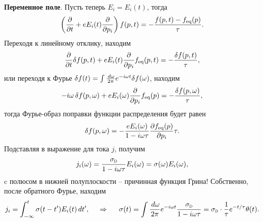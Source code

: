 \textbf{Переменное поле}. Пусть теперь $E_i = E_i (t)$, тогда
\begin{equation*}
	\left(
		\frac{\partial }{\partial t} + e E_i (t) \frac{\partial }{\partial p_i} 
	\right) f(p, t) = - \frac{f(p, t) - f_{\textnormal{eq}} (p)}{\tau}.
\end{equation*}
Переходя к линейному отклику, находим
\begin{equation*}
		\frac{\partial }{\partial t} \delta f(p, t) + e E_i (t) \frac{\partial }{\partial p_i} 
	 f_{\textnormal{eq}} (p, t) = - \frac{\delta f(p, t)}{\tau},
\end{equation*}
или переходя к Фурье $\delta f(t) = \int \frac{\, d \omega}{2\pi} e^{-i \omega t} \delta f(\omega)$, находим
\begin{equation*}
	 - i \omega \, \delta f(p, \omega) + e E_i (\omega) \frac{\partial }{\partial p_i}  f_{\textnormal{eq}} (p) = - \frac{\delta f(p, \omega)}{\tau},
\end{equation*}
тогда Фурье-образ поправки функции распределения будет равен
\begin{equation*}
	\delta f(p, \omega) = -  \frac{e E_i (\omega) }{1-i \omega \tau}  \frac{\partial f_{\textnormal{eq}}(p)}{\partial p_i} \tau .
\end{equation*}
Подставляя в выражение для тока $j$, получим
\begin{equation*}
	j_i (\omega) = \frac{\sigD}{1 - i \omega \tau} E_i (\omega) = \sigma(\omega) E_i (\omega),
\end{equation*}
c полюсом в нижней полуплоскости -- причинная функция Грина! Собственно, после обратного Фурье, находим
\begin{equation*}
	j_i = \int_{-\infty}^{t} \sigma(t-t') E_i (t) \d t',
	\hspace{0.5cm} \Rightarrow \hspace{0.5cm}
	\sigma(t) = \int \frac{\d \omega}{2\pi} e^{- i \omega t} \frac{\sigD}{1-i \omega \tau}  =  \sigD \cdot \frac{1}{\tau} e^{-t/\tau} \theta(t).
\end{equation*}
